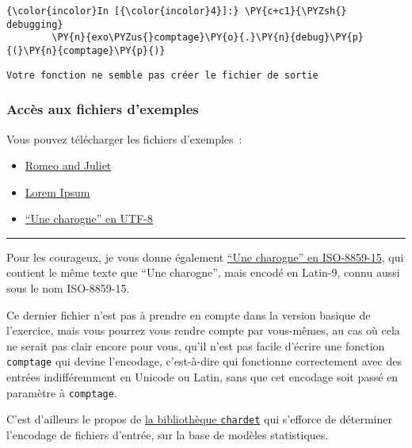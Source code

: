     \begin{Verbatim}[commandchars=\\\{\},frame=single,framerule=0.3mm,rulecolor=\color{cellframecolor}]
{\color{incolor}In [{\color{incolor}4}]:} \PY{c+c1}{\PYZsh{} debugging}
        \PY{n}{exo\PYZus{}comptage}\PY{o}{.}\PY{n}{debug}\PY{p}{(}\PY{n}{comptage}\PY{p}{)}
\end{Verbatim}


    \begin{Verbatim}[commandchars=\\\{\},frame=single,framerule=0.3mm,rulecolor=\color{cellframecolor}]
Votre fonction ne semble pas créer le fichier de sortie
\end{Verbatim}

    \hypertarget{accuxe8s-aux-fichiers-dexemples}{%
\subsubsection{Accès aux fichiers
d'exemples}\label{accuxe8s-aux-fichiers-dexemples}}

    Vous pouvez télécharger les fichiers d'exemples~:

\begin{itemize}
\tightlist
\item
  \href{data/romeo_and_juliet.txt}{Romeo and Juliet}
\item
  \href{data/lorem_ipsum.txt}{Lorem Ipsum}
\item
  \href{data/une_charogne_unicode.txt}{``Une charogne'' en UTF-8}
\end{itemize}

\begin{center}\rule{0.5\linewidth}{\linethickness}\end{center}

Pour les courageux, je vous donne également
\href{data/une_charogne_iso15.txt}{``Une charogne'' en ISO-8859-15}, qui
contient le même texte que ``Une charogne'', mais encodé en Latin-9,
connu aussi sous le nom ISO-8859-15.

Ce dernier fichier n'est pas à prendre en compte dans la version basique
de l'exercice, mais vous pourrez vous rendre compte par vous-mêmes, au
cas où cela ne serait pas clair encore pour vous, qu'il n'est pas facile
d'écrire une fonction \texttt{comptage} qui devine l'encodage,
c'est-à-dire qui fonctionne correctement avec des entrées indifféremment
en Unicode ou Latin, sans que cet encodage soit passé en paramètre à
\texttt{comptage}.

    C'est d'ailleurs le propos de
\href{https://pypi.python.org/pypi/chardet}{la bibliothèque
\texttt{chardet}} qui s'efforce de déterminer l'encodage de fichiers
d'entrée, sur la base de modèles statistiques.


    
    
    
